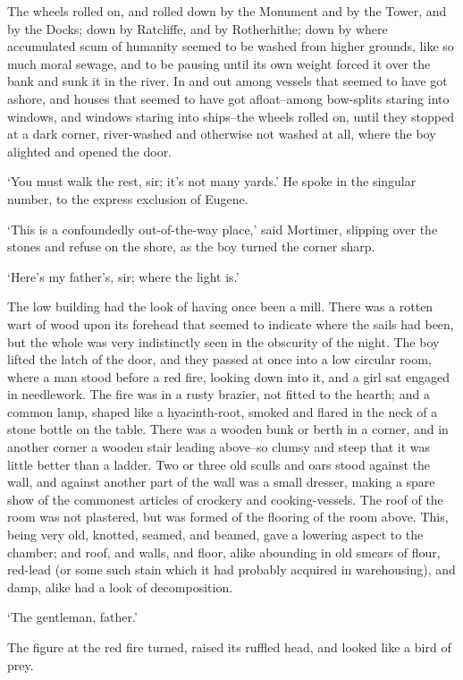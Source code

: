 The wheels rolled on, and rolled down by the Monument and by the Tower,
and by the Docks; down by Ratcliffe, and by Rotherhithe; down by where
accumulated scum of humanity seemed to be washed from higher grounds,
like so much moral sewage, and to be pausing until its own weight forced
it over the bank and sunk it in the river. In and out among vessels
that seemed to have got ashore, and houses that seemed to have got
afloat--among bow-splits staring into windows, and windows staring
into ships--the wheels rolled on, until they stopped at a dark corner,
river-washed and otherwise not washed at all, where the boy alighted and
opened the door.

‘You must walk the rest, sir; it’s not many yards.’ He spoke in the
singular number, to the express exclusion of Eugene.

‘This is a confoundedly out-of-the-way place,’ said Mortimer, slipping
over the stones and refuse on the shore, as the boy turned the corner
sharp.

‘Here’s my father’s, sir; where the light is.’

The low building had the look of having once been a mill. There was a
rotten wart of wood upon its forehead that seemed to indicate where
the sails had been, but the whole was very indistinctly seen in the
obscurity of the night. The boy lifted the latch of the door, and they
passed at once into a low circular room, where a man stood before a red
fire, looking down into it, and a girl sat engaged in needlework. The
fire was in a rusty brazier, not fitted to the hearth; and a common
lamp, shaped like a hyacinth-root, smoked and flared in the neck of a
stone bottle on the table. There was a wooden bunk or berth in a corner,
and in another corner a wooden stair leading above--so clumsy and steep
that it was little better than a ladder. Two or three old sculls and
oars stood against the wall, and against another part of the wall was a
small dresser, making a spare show of the commonest articles of crockery
and cooking-vessels. The roof of the room was not plastered, but was
formed of the flooring of the room above. This, being very old, knotted,
seamed, and beamed, gave a lowering aspect to the chamber; and roof, and
walls, and floor, alike abounding in old smears of flour, red-lead (or
some such stain which it had probably acquired in warehousing), and
damp, alike had a look of decomposition.

‘The gentleman, father.’

The figure at the red fire turned, raised its ruffled head, and looked
like a bird of prey.

